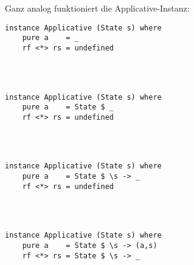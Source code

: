 \documentclass{beamer}
\begin{document}
\begin{frame}[fragile]
Ganz analog funktioniert die Applicative-Instanz:
\begin{overprint}
\begin{verbatim}
instance Applicative (State s) where
    pure a    = _
    rf <*> rs = undefined

    
    
\end{verbatim}
\begin{verbatim}
instance Applicative (State s) where
    pure a    = State $ _
    rf <*> rs = undefined

    
    
\end{verbatim}
\begin{verbatim}
instance Applicative (State s) where
    pure a    = State $ \s -> _
    rf <*> rs = undefined

    
    
\end{verbatim}
\begin{verbatim}
instance Applicative (State s) where
    pure a    = State $ \s -> (a,s)
    rf <*> rs = State $ \s -> _

    
    

\end{verbatim}
\end{overprint}
\end{frame}
\end{document}
